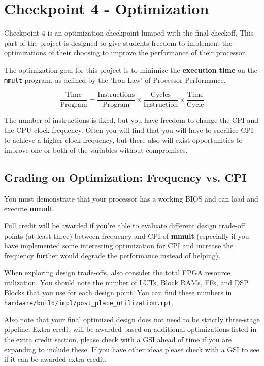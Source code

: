 \section{Checkpoint 4 - Optimization}

Checkpoint 4 is an optimization checkpoint lumped with the final checkoff.
This part of the project is designed to give students freedom to implement the optimizations of their choosing to improve the performance of their processor.

The optimization goal for this project is to minimize the \textbf{execution time} on the \verb|mmult| program, as defined by the 'Iron Law' of Processor Performance.

\begin{equation*}
\frac{\text{Time}}{\text{Program}} = \frac{\text{Instructions}}{\text{Program}} \times \frac{\text{Cycles}}{\text{Instruction}} \times \frac{\text{Time}}{\text{Cycle}}
\end{equation*}

The number of instructions is fixed, but you have freedom to change the CPI and the CPU clock frequency.
Often you will find that you will have to sacrifice CPI to achieve a higher clock frequency, but there also will exist opportunities to improve one or both of the variables without compromises.

\subsection{Grading on Optimization: Frequency vs. CPI}
You must demonstrate that your processor has a working BIOS and can load and execute \textbf{mmult}.

Full credit will be awarded if you're able to evaluate different design trade-off points (at least three) between frequency and CPI of \textbf{mmult} (especially if you have implemented some interesting optimization for CPI and increase the frequency further would degrade the performance instead of helping).

When exploring design trade-offs, also consider the total FPGA resource utilization. You should note the number of LUTs, Block RAMs, FFs, and DSP Blocks that you use for each design point. You can find these numbers in \verb|hardware/build/impl/post_place_utilization.rpt|.

Also note that your final optimized design does not need to be strictly three-stage pipeline. Extra credit will be awarded based on additional optimizations listed in the extra credit section, please check with a GSI ahead of time if you are expanding to include these. If you have other ideas please check with a GSI to see if it can be awarded extra credit.

